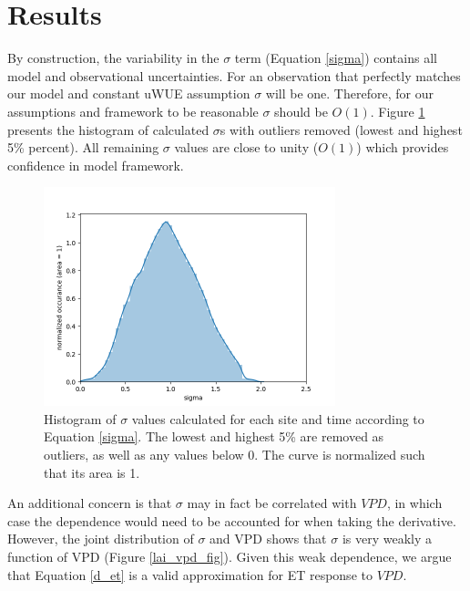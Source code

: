 \documentclass[draft,linenumbers]{agujournal}
\begin{document}
\section{Results}
\label{results}

By construction, the variability in the $\sigma$ term (Equation \ref{sigma}) contains all model and observational uncertainties. For an observation that perfectly matches our model and constant uWUE assumption $\sigma$ will be one. Therefore, for our assumptions and framework to be reasonable $\sigma$ should be $O(1)$. Figure \ref{lai_fig} presents the histogram of calculated $\sigma$s with outliers removed (lowest and highest 5\% percent). All remaining $\sigma$ values are close to unity ($O(1)$) which provides confidence in model framework.

\begin{figure}[h]
\centering
\includegraphics[width=20pc]{./fig02.png}
\caption{Histogram of $\sigma$ values calculated for each site and time according to Equation \ref{sigma}. The lowest and highest 5\% are removed as outliers, as well as any values below 0. The curve is normalized such that its area is 1. }
\label{lai_fig}
\end{figure}

An additional concern is that $\sigma$ may in fact be correlated with $VPD$, in which case the dependence would need to be accounted for when taking the derivative. However, the joint distribution of $\sigma$ and VPD shows that $\sigma$ is very weakly a function of VPD (Figure \ref{lai_vpd_fig}). Given this weak dependence, we argue that Equation \ref{d_et} is a valid approximation for ET response to $VPD$.
\end{document}
